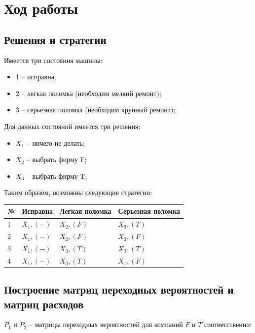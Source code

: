 \documentclass[14pt,a4paper,report]{report}
\begin{document}
\section{Ход работы}

\subsection{Решения и стратегии}

Имеется три состояния машины:

\begin{itemize}
	\item 1 -- исправна;
	\item 2 -- легкая поломка (необходим мелкий ремонт);
	\item 3 -- серьезная поломка (необходим крупный ремонт);
\end{itemize}

Для данных состояний имеется три решения:

\begin{itemize}
	\item $X_1$ -- ничего не делать;
	\item $X_2$ -- выбрать фирму F;
	\item $X_3$ -- выбрать фирму T;
\end{itemize}

Таким образом, возможны следующие стратегии:

\begin{table}[h!]
	\centering
	\bgroup
	\def\arraystretch{1}
	\begin{tabular}{ | m{0.3cm} | m{2.2cm} | m{2.8cm} | m{3.1cm} | }
		\hline
		№ & Исправна & Легкая поломка & Серьезная поломка \\ \hline
		1 & $X_1, (-)$ & $X_2, (F)$ & $X_3, (T)$ \\ \hline
		2 & $X_1, (-)$ & $X_2, (F)$ & $X_2, (F)$ \\ \hline
		3 & $X_1, (-)$ & $X_3, (T)$ & $X_3, (T)$ \\ \hline
		4 & $X_1, (-)$ & $X_3, (T)$ & $X_1, (F)$ \\
		\hline
	\end{tabular}
	\egroup
\end{table}

\subsection{Построение матриц переходных вероятностей и матриц расходов}

$P_1$ и $P_2$ -- матрицы переходных вероятностей для компаний $F$ и $T$ соответственно:
\\
\end{document}
